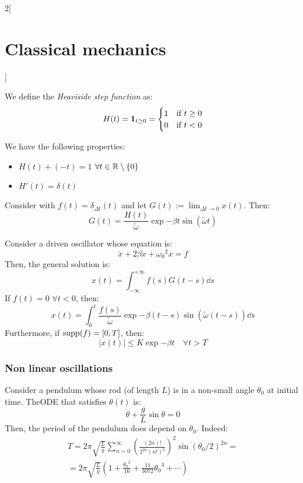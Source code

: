 \documentclass[../../../main_physics.tex]{subfiles}
\begin{document}
\begin{multicols}{2}[\section{Classical mechanics}]
\begin{proposition}
  \end{proposition}
  \begin{definition}
    We define the \emph{Heaviside step function} as: $$H(t)=\boldsymbol{\mathrm{1}}_{t\geq 0}=
      \begin{cases}
        1 & \text{if }t\geq 0 \\
        0 & \text{if }t<0
      \end{cases}
    $$
  \end{definition}
  \begin{proposition}
    We have the following properties:
    \begin{itemize}
      \item $H(t)+(-t)=1$ $\forall t\in\mathbb{R}\setminus\{0\}$
      \item $H'(t)=\delta(t)$
    \end{itemize}
  \end{proposition}
  \begin{proposition}
    Consider  with $f(t)=\delta_{\Delta t}(t)$ and let $\displaystyle G(t):=\lim_{\Delta t\to 0}x(t)$. Then: $$G(t)=\frac{H(t)}{\tilde{\omega}}\exp{-\beta t}\sin(\tilde{\omega}t)$$
  \end{proposition}
  \begin{theorem}
    Consider a driven oscillator whose equation is:
    \begin{equation*}
      \ddot{x}+2\beta\dot{x}+{\omega_0}^2x=f
    \end{equation*}
    Then, the general solution is: $$x(t)=\int_{-\infty}^{+\infty}f(s)G(t-s)\dd{s}$$
    If $f(t)=0$ $\forall t<0$, then:
    $$x(t)=\int_0^t\frac{f(s)}{\tilde{\omega}}\exp{-\beta (t-s)}\sin(\tilde{\omega}(t-s))\dd{s}$$
    Furthermore, if $\operatorname{supp} (f)=[0,T]$, then: $$|x(t)|\leq K\exp{-\beta t}\quad\forall t> T$$
  \end{theorem}
  \subsubsection{Non linear oscillations}
  \begin{definition}
    Consider a pendulum whose rod (of length $L$) is in a non-small angle $\theta_0$ at initial time. TheODE that satisfies $\theta(t)$ is:
    $$\ddot{\theta}+\frac{g}{L}\sin\theta=0$$
    Then, the period of the pendulum does depend on $\theta_0$. Indeed:
    \begin{multline*}
      T=2\pi\sqrt{\frac{L}{g}}\sum_{n=0}^\infty{\left(\frac{(2n)!}{2^{2n}{(n!)}^2}\right)}^2{\sin(\theta_0/2)}^{2n}=\\=2\pi\sqrt{\frac{L}{g}}\left(1+\frac{{\theta_0}^2}{16}+\frac{11}{3072}{\theta_0}^4+\cdots\right)
    \end{multline*}
  \end{definition}

\end{multicols}
\end{document}
